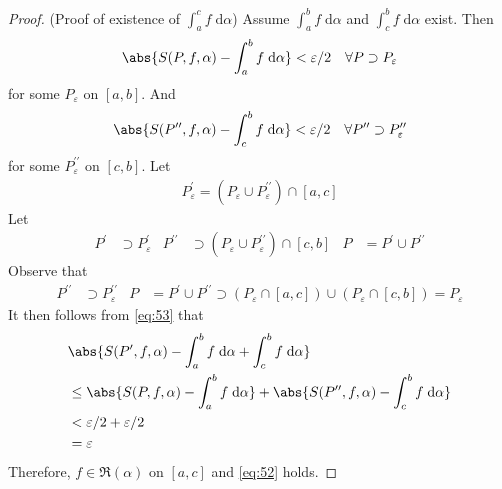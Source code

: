 \documentclass[thmcnt=section, 12pt]{elegantbook}
\begin{document}
\begin{proof}
    \par (Proof of existence of $\int_a^c f \; \mathrm{d}\alpha$) Assume $\int_a^b f \; \mathrm{d}\alpha$ and $\int_c^b f \; \mathrm{d}\alpha$ exist. Then 
    \begin{align*}
        \abs{S(P, f, \alpha) - \int_a^b f \; \mathrm{d}\alpha} < \varepsilon / 2
        \quad \forall P \supset P_\varepsilon
    \end{align*}
    for some $P_\varepsilon$ on $[a, b]$. And
    \begin{align*}
        \abs{S(P^{\prime\prime}, f, \alpha) - \int_c^b f \; \mathrm{d}\alpha} < \varepsilon / 2
        \quad \forall P^{\prime\prime} \supset P_\varepsilon^{\prime\prime}
    \end{align*}
    for some $P_\varepsilon^{\prime\prime}$ on $[c, b]$.
    Let
    \begin{align*}
        P_\varepsilon^\prime = (P_\varepsilon \cup P_\varepsilon^{\prime\prime}) \cap [a, c]
    \end{align*}
    Let
    \begin{align*}
        P^\prime &\supset P_\varepsilon^\prime &
        P^{\prime\prime} &\supset (P_\varepsilon \cup P_\varepsilon^{\prime\prime}) \cap [c, b] &
        P &= P^\prime \cup P^{\prime\prime}
    \end{align*} 
    Observe that 
    \begin{align*}
        P^{\prime\prime} &\supset P_\varepsilon^{\prime\prime} &
        P &= P^\prime \cup P^{\prime\prime}
        \supset (P_\varepsilon \cap [a, c]) \cup (P_\varepsilon \cap [c, b])
        = P_\varepsilon
    \end{align*}
    It then follows from \eqref{eq:53} that
    \begin{align*}
        &\abs{
            S(P^\prime, f, \alpha)
            - \int_a^b f \; \mathrm{d}\alpha
            + \int_c^b f \; \mathrm{d}\alpha 
        } \\ 
        &\leq \abs{
            S(P, f, \alpha)
            - \int_a^b f \; \mathrm{d}\alpha
        } + \abs{
            S(P^{\prime\prime}, f, \alpha)
            - \int_c^b f \; \mathrm{d}\alpha
        } \\ 
        &< \varepsilon / 2 + \varepsilon / 2 \\ 
        &= \varepsilon
    \end{align*} 
    Therefore, $f \in \mathfrak{R}(\alpha)$ on $[a, c]$ and \eqref{eq:52} holds.

\end{proof}
\end{document}
